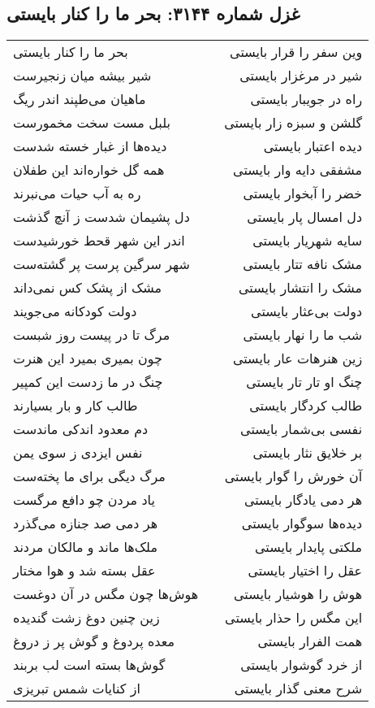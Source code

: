 \begin{center}
\section*{غزل شماره ۳۱۴۴: بحر ما را کنار بایستی}
\label{sec:3144}
\begin{longtable}{l p{0.5cm} r}
بحر ما را کنار بایستی
&&
وین سفر را قرار بایستی
\\
شیر بیشه میان زنجیرست
&&
شیر در مرغزار بایستی
\\
ماهیان می‌طپند اندر ریگ
&&
راه در جویبار بایستی
\\
بلبل مست سخت مخمورست
&&
گلشن و سبزه زار بایستی
\\
دیده‌ها از غبار خسته شدست
&&
دیده اعتبار بایستی
\\
همه گل خواره‌اند این طفلان
&&
مشفقی دایه وار بایستی
\\
ره به آب حیات می‌نبرند
&&
خضر را آبخوار بایستی
\\
دل پشیمان شدست ز آنچ گذشت
&&
دل امسال پار بایستی
\\
اندر این شهر قحط خورشیدست
&&
سایه شهریار بایستی
\\
شهر سرگین پرست پر گشته‌ست
&&
مشک نافه تتار بایستی
\\
مشک از پشک کس نمی‌داند
&&
مشک را انتشار بایستی
\\
دولت کودکانه می‌جویند
&&
دولت بی‌عثار بایستی
\\
مرگ تا در پیست روز شبست
&&
شب ما را نهار بایستی
\\
چون بمیری بمیرد این هنرت
&&
زین هنرهات عار بایستی
\\
چنگ در ما زدست این کمپیر
&&
چنگ او تار تار بایستی
\\
طالب کار و بار بسیارند
&&
طالب کردگار بایستی
\\
دم معدود اندکی ماندست
&&
نفسی بی‌شمار بایستی
\\
نفس ایزدی ز سوی یمن
&&
بر خلایق نثار بایستی
\\
مرگ دیگی برای ما پخته‌ست
&&
آن خورش را گوار بایستی
\\
یاد مردن چو دافع مرگست
&&
هر دمی یادگار بایستی
\\
هر دمی صد جنازه می‌گذرد
&&
دیده‌ها سوگوار بایستی
\\
ملک‌ها ماند و مالکان مردند
&&
ملکتی پایدار بایستی
\\
عقل بسته شد و هوا مختار
&&
عقل را اختیار بایستی
\\
هوش‌ها چون مگس در آن دوغست
&&
هوش را هوشیار بایستی
\\
زین چنین دوغ زشت گندیده
&&
این مگس را حذار بایستی
\\
معده پردوغ و گوش پر ز دروغ
&&
همت الفرار بایستی
\\
گوش‌ها بسته است لب بربند
&&
از خرد گوشوار بایستی
\\
از کنایات شمس تبریزی
&&
شرح معنی گذار بایستی
\\
\end{longtable}
\end{center}
